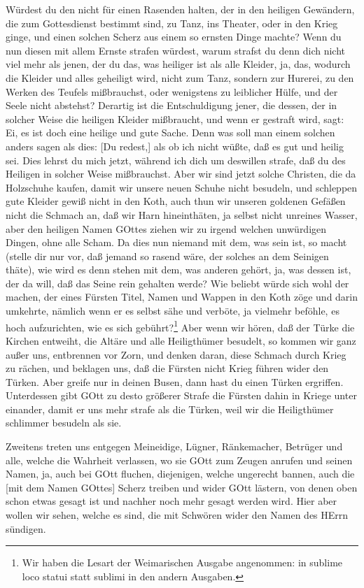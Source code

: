 Würdest du den nicht für einen Rasenden halten, der in den heiligen Gewändern, die zum Gottesdienst bestimmt sind, zu Tanz, ins Theater, oder in den Krieg ginge, und einen solchen Scherz aus einem so ernsten Dinge machte? Wenn du nun diesen mit allem Ernste strafen würdest, warum strafst du denn dich nicht viel mehr als jenen, der du das, was heiliger ist als alle Kleider, ja, das, wodurch die Kleider und alles geheiligt wird, nicht zum Tanz, sondern zur Hurerei, zu den Werken des Teufels mißbrauchst, oder wenigstens zu leiblicher Hülfe, und der Seele nicht abstehst? Derartig ist die Entschuldigung jener, die dessen, der in solcher Weise die heiligen Kleider mißbraucht, und wenn er gestraft wird, sagt: Ei, es ist doch eine heilige und gute Sache. Denn was soll man einem solchen anders sagen als dies: [Du redest,] als ob ich nicht wüßte, daß es gut und heilig sei. Dies lehrst du mich jetzt, während ich dich um deswillen strafe, daß du des Heiligen in solcher Weise mißbrauchst. Aber wir sind jetzt solche Christen, die da Holzschuhe kaufen, damit wir unsere neuen Schuhe nicht besudeln, und schleppen gute Kleider gewiß nicht in den Koth, auch thun wir unseren goldenen Gefäßen nicht die Schmach an, daß wir Harn hineinthäten, ja selbst nicht unreines Wasser, aber den heiligen Namen GOttes ziehen wir zu irgend welchen unwürdigen Dingen, ohne alle Scham. Da dies nun niemand mit dem, was sein ist, so macht (stelle dir nur vor, daß jemand so rasend wäre, der solches an dem Seinigen thäte), wie wird es denn stehen mit dem, was anderen gehört, ja, was dessen ist, der da will, daß das Seine rein gehalten werde? Wie beliebt würde sich wohl der machen, der eines Fürsten Titel, Namen und Wappen in den Koth zöge und darin umkehrte, nämlich wenn er es selbst sähe und verböte, ja vielmehr beföhle, es hoch aufzurichten, wie es sich gebührt?\footnote{Wir haben die Lesart der Weimarischen Ausgabe angenommen: in sublime loco statui statt sublimi in den andern Ausgaben.} Aber wenn wir hören, daß der Türke die Kirchen entweiht, die Altäre und alle Heiligthümer besudelt, so kommen wir ganz außer uns, entbrennen vor Zorn, und denken daran, diese Schmach durch Krieg zu rächen, und beklagen uns, daß die Fürsten nicht Krieg führen wider den Türken. Aber greife nur in deinen Busen, dann hast du einen Türken ergriffen. Unterdessen gibt GOtt zu desto größerer Strafe die Fürsten dahin in Kriege unter einander, damit er uns mehr strafe als die Türken, weil wir die Heiligthümer schlimmer besudeln als sie.

Zweitens treten uns entgegen Meineidige, Lügner, Ränkemacher, Betrüger und alle, welche die Wahrheit verlassen, wo sie GOtt zum Zeugen anrufen und seinen Namen, ja, auch bei GOtt fluchen, diejenigen, welche ungerecht bannen, auch die [mit dem Namen GOttes] Scherz treiben und wider GOtt lästern, von denen oben schon etwas gesagt ist und nachher noch mehr gesagt werden wird. Hier aber wollen wir sehen, welche es sind, die mit Schwören wider den Namen des HErrn sündigen.

